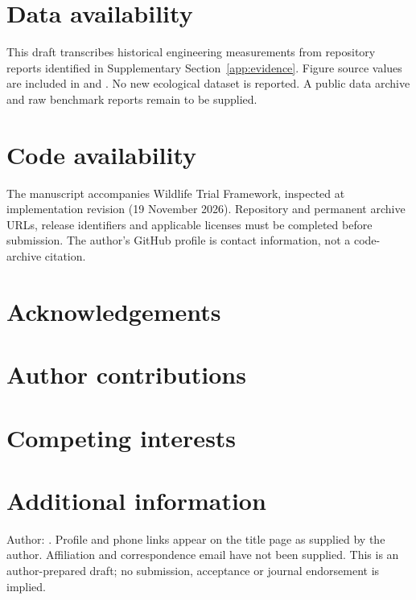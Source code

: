 \section*{Data availability}
This draft transcribes historical engineering measurements from repository
reports identified in Supplementary Section~\ref{app:evidence}. Figure source
values are included in  and
. No new ecological dataset is reported.
A public data archive and raw benchmark reports remain to be supplied.

\section*{Code availability}
The manuscript accompanies Wildlife Trial Framework, inspected at implementation
revision \snapshot{} (19 November 2026). Repository and permanent archive URLs,
release identifiers and applicable licenses must be completed before submission.
The author's GitHub profile is contact information, not a code-archive citation.

\section*{Acknowledgements}

\section*{Author contributions}

\section*{Competing interests}

\section*{Additional information}
Author: \paperauthor. Profile and phone links appear on the title page as supplied
by the author. Affiliation and correspondence email have not been supplied.
This is an author-prepared draft; no submission, acceptance or journal endorsement
is implied.
